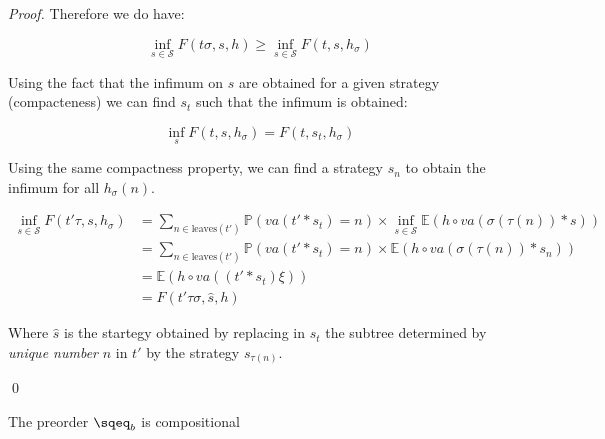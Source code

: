 \begin{proof}
    Therefore we do have:

    \begin{equation*}
        \inf_{s \in \mathcal{S}} F(t\sigma, s, h) \geq \inf_{s \in \mathcal{S}} F (t,s,h_\sigma)
    \end{equation*}

    Using the fact that the infimum on $s$ are obtained 
    for a given strategy (compacteness) we can find $s_t$
    such that the infimum is obtained:
    
    \begin{equation*}
        \inf_s F (t,s,h_\sigma) = F(t,s_t, h_\sigma)
    \end{equation*}

    Using the same compactness property, we can find a strategy 
    $s_n$ to obtain the infimum for all  
    $h_\sigma (n)$. 

    \begin{align*}
        \inf_{s \in \mathcal{S}} F (t' \tau, s, h_\sigma) &= 
        \sum_{n \in \text{leaves}(t')} 
        \mathbb{P}( va(t' * s_t) = n ) \times \inf_{s \in \mathcal{S}} \mathbb{E}\left( h \circ va (
        \sigma(\tau(n)) * s) \right) \\
        &= 
        \sum_{n \in \text{leaves}(t')} 
        \mathbb{P}( va(t' * s_t) = n ) \times \mathbb{E}\left( h \circ va (
        \sigma(\tau(n)) * s_n) \right) \\
        &= 
        \mathbb{E} \left( h \circ va ((t' * s_t) \xi) \right)\\
        &= 
        F (t' \tau \sigma, \hat{s}, h)
    \end{align*}
    
    Where $\hat{s}$ is the startegy obtained by replacing in $s_t$ the subtree  
    determined by \emph{unique number} $n$
    in $t'$ by the strategy $s_{\tau(n)}$. 

    \qed
\end{proof}

\begin{alemma}[Compositionality]
    \label{lem:operiscomp}
    The preorder $\sqeq_b$ is compositional
\end{alemma}

